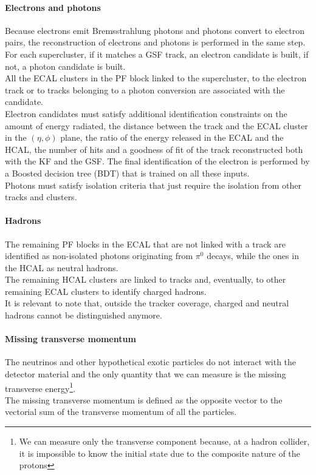 \paragraph*{Electrons and photons}
Because electrons emit Bremsstrahlung photons and photons convert to electron pairs, the reconstruction of electrons and photons is performed in the same step.\\
For each supercluster, if it matches a GSF track, an electron candidate is built, if not, a photon candidate is built. \\
All the ECAL clusters in the PF block linked to the supercluster, to the electron track or to tracks belonging to a photon conversion are associated with the candidate.\\
Electron candidates must satisfy additional identification constraints on the amount of energy radiated, the distance between the track and the ECAL cluster in the $(\eta,\phi)$ plane, the ratio of the energy released in the ECAL and the HCAL, the number of hits and a goodness of fit of the track reconstructed both with the KF and the GSF. The final identification of the electron is performed by a Boosted decision tree (BDT) that is trained on all these inputs.\\
Photons must satisfy isolation criteria that just require the isolation from other tracks and clusters.

\paragraph*{Hadrons}
The remaining PF blocks in the ECAL that are not linked with a track are identified as non-isolated photons originating from $\pi^0$ decays, while the ones in the HCAL as neutral hadrons.\\
The remaining HCAL clusters are linked to tracks and, eventually, to other remaining ECAL clusters to identify charged hadrons.\\
It is relevant to note that, outside the tracker coverage, charged and neutral hadrons cannot be distinguished anymore.

\paragraph*{Missing transverse momentum}
The neutrinos and other hypothetical exotic particles do not interact with the detector material and the only quantity that we can measure is the missing transverse energy\footnote{We can measure only the transverse component because, at a hadron collider, it is impossible to know the initial state due to the composite nature of the protons}.\\
The missing transverse momentum is defined as the opposite vector to the vectorial sum of the transverse momentum of all the particles.

